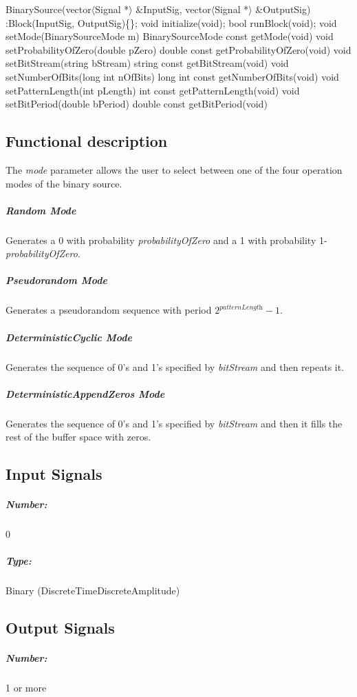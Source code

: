 BinarySource(vector$\langle$Signal *$\rangle$ \&InputSig, vector$\langle$Signal *$\rangle$ \&OutputSig) :Block(InputSig, OutputSig)\{\};
\bigbreak	 
void initialize(void);
\bigbreak	 
bool runBlock(void);
\bigbreak	 
void setMode(BinarySourceMode m)
BinarySourceMode const getMode(void)
\bigbreak	 
void setProbabilityOfZero(double pZero) 
\bigbreak
double const getProbabilityOfZero(void) 
\bigbreak	 
void setBitStream(string bStream) 
\bigbreak
string const getBitStream(void) 
\bigbreak	 
void setNumberOfBits(long int nOfBits)
\bigbreak
long int const getNumberOfBits(void) 
\bigbreak	 
void setPatternLength(int pLength) 
\bigbreak
int const getPatternLength(void) 
\bigbreak	 
void setBitPeriod(double bPeriod)
\bigbreak
double const getBitPeriod(void) 

\subsection*{Functional description}

The \textit{mode} parameter allows the user to select between one of the four operation modes of the binary source.

\subparagraph*{Random Mode}
Generates a 0 with probability \textit{probabilityOfZero} and a 1 with probability 1-\textit{probabilityOfZero}.

\subparagraph*{Pseudorandom Mode} 
Generates a pseudorandom sequence with period $2^\textit{patternLength}-1$.

\subparagraph*{DeterministicCyclic Mode}
Generates the sequence of 0's and 1's specified by \textit{bitStream} and then repeats it.

\subparagraph*{DeterministicAppendZeros Mode}
Generates the sequence of 0's and 1's specified by \textit{bitStream} and then it fills the rest of the buffer space with zeros.

\subsection*{Input Signals}


\subparagraph*{Number:} 0

\subparagraph*{Type:} Binary (DiscreteTimeDiscreteAmplitude)

\subsection*{Output Signals}

\subparagraph*{Number:} 1 or more

